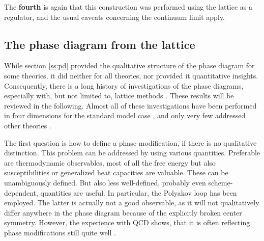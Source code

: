 \documentclass[final,12pt]{article}
\newcommand*{\1}{1\!\!\!\bot}
\begin{document}
The {\bf fourth} is again that this construction was performed using the lattice as a regulator, and the usual caveats concerning the continuum limit apply.

\subsection{The phase diagram from the lattice}\label{ss:pdlat}

While section \ref{ss:pd} provided the qualitative structure of the phase diagram for some theories, it did neither for all theories, nor provided it quantitative insights. Consequently, there is a long history of investigations of the phase diagrams, especially with, but not limited to, lattice methods \cite{Lang:1981qg,Kikugawa:1982yh,Brower:1982yn,Kuhnelt:1983mw,Gerdt:1984ft,Evertz:1985fc,Langguth:1985eu,Langguth:1985dr,Gerdt:1985rb,Gerdt:1985xh,Olynyk:1985tr,Munehisa:1986jc,Evertz:1986vp,Hasenfratz:1986za,Bock:1989fk,Heller:1993yv,Campos:1997dc,Knechtli:1998gf,Knechtli:1999qe,Caudy:2007sf,Greensite:2008ss,Bonati:2009pf,Bonati:2009yi,Wurtz:2009gf,Lewis:2010ps,Maas:2014pba,Gongyo:2014jfa,Gies:2015lia,Biswal:2015rul,Maas:2016ngo,Gies:2016kkk,Bazavov:2019qih,Baier:1988sc}. These results will be reviewed in the following. Almost all of these investigations have been performed in four dimensions for the standard model case \cite{Kuhnelt:1983mw,Gerdt:1984ft,Evertz:1985fc,Langguth:1985eu,Langguth:1985dr,Gerdt:1985rb,Munehisa:1986jc,Evertz:1986vp,Hasenfratz:1986za,Bock:1989fk,Heller:1993yv,Campos:1997dc,Knechtli:1998gf,Knechtli:1999qe,Caudy:2007sf,Greensite:2008ss,Bonati:2009pf,Bonati:2009yi,Maas:2014pba,Gies:2015lia,Biswal:2015rul,Gies:2016kkk}, and only very few addressed other theories \cite{Kikugawa:1982yh,Brower:1982yn,Gupta:1983zv,Gerdt:1985xh,Olynyk:1985tr,Lee:1985yi,Shrock:1986fg,Shrock:1986bu,Gongyo:2014jfa,Maas:2016ngo,Lewis:2010ps,Wurtz:2009gf,Bazavov:2019qih,Baier:1988sc}.

The first question is how to define a phase modification, if there is no qualitative distinction. This problem can be addressed by using various quantities. Preferable are thermodynamic observables, most of all the free energy but also susceptibilities or generalized heat capacities are valuable. These can be unambiguously defined. But also less well-defined, probably even scheme-dependent, quantities are useful. In particular, the Polyakov loop has been employed. The latter is actually not a good observable, as it will not qualitatively differ anywhere in the phase diagram because of the explicitly broken center symmetry. However, the experience with QCD shows, that it is often reflecting phase modifications still quite well \cite{Gattringer:2010zz,Cossu:2007dk}.
\end{document}
